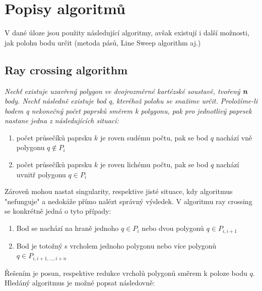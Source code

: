 \documentclass{article}
\begin{document}
\section{Popisy algoritmů} %
V dané úloze jsou použity následující algoritmy, avšak existují i další možnosti, jak polohu bodu určit (metoda pásů, Line Sweep algorithm aj.)
\subsection{Ray crossing algorithm}
\textsl{Nechť existuje uzavřený polygon ve dvojrozměrné kartézské soustavě, tvořený \textbf n body. Nechť následně existuje bod q, kteréhož polohu se snažime určit. Proložíme-li bodem q nekonečný počet paprsků směrem k polygonu, pak pro jednotlivý paprsek nastane jedna z následujících situací: }
\begin{enumerate}
\item   počet průsečíků paprsku  $k$ je roven sudému počtu, pak se bod $q$ nachází vně polygonu  $q {\not \in} P_i$ 
\item  počet průsečíků paprsku  $k$ je roven lichému počtu, pak se bod $q$ nachází uvnitř polygonu  $q \in P_i$
\end{enumerate} 
Zároveň mohou nastat singularity, respektive jisté situace, kdy algoritmus "nefunguje" a nedokáže přímo nalézt správný výsledek. V algoritmu ray crossing se konkrétně jedná o tyto případy:
\begin{enumerate}
\item   Bod se nachází na hraně jednoho  $q {\in} P_i$ nebo dvou polygonů $q {\in} P_{i,i+1}$ 
\item   Bod je totožný s vrcholem jednoho polygonu nebo více polygonů $q {\in} P_{i,i+1,...,i+n}$
\end{enumerate} 
Řešením je posun, respektive redukce vrcholů polygonů směrem k poloze bodu  $q$.
\\
Hledáný algoritmus je možné popsat následovně:
\end{document}
